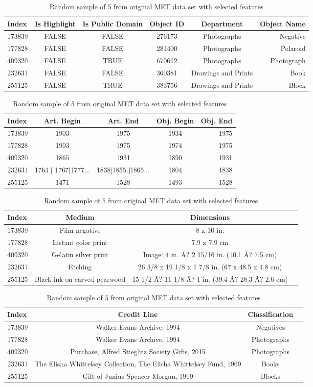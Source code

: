 \documentclass[12pt]{article}
\theoremstyle{definition}
\begin{document}
\begin{table}[htbp]
\centering 
\begin{tabular}{l*{4}{c}r}
Index              & Is Highlight & Is Public Domain & Object ID & Department & Object Name  \\
\hline
173839 & FALSE & FALSE & 276173 & Photographs & Negative   \\
177828            &  FALSE & FALSE & 281400 & Photographs &  Polaroid  \\
409320           &  FALSE & TRUE & 670612 & Photographs &  Photograph  \\
232631    &  FALSE & FALSE & 360381 & Drawings and Prints &  Book   \\
255125    &  FALSE & TRUE & 383756 & Drawings and Prints &  Block  \\
\end{tabular}
\begin{tabular}{l*{3}{c}r}
Index  & Art. Begin & Art. End  &Obj. Begin & Obj. End  \\
\hline
173839 & 1903 & 1975 & 1934  & 1975  \\
177828 & 1903 & 1975&1974  & 1975    \\
409320 &  1865 & 1931 & 1890 & 1931  \\
232631 & 1764 $|$ 1767$|$1777...&1838$|$1855  $|$1865... & 1804 & 1838  \\
255125 & 1471 & 1528 & 1493& 1528   \\
\end{tabular}
\begin{tabular}{l*{2 }{c}r}
Index  & Medium & Dimensions\\
\hline
173839 & Film negative & 8 x 10 in.\\
177828 & Instant color print & 7.9 x 7.9 cm\\
409320 & Gelatin silver print &  Image: 4 in. Ã? 2 15/16 in. (10.1 Ã? 7.5 cm)  \\ 
232631 &  Etching &  26 3/8 x 19 1/8 x 1 7/8 in. (67 x 48.5 x 4.8 cm)\\
255125 & Black ink on carved pearwood & 15 1/2 Ã? 11 1/8 Ã? 1 in. (39.4 Ã? 28.3 Ã? 2.6 cm)\\
\end{tabular}
\begin{tabular}{l*{2}{c}r}
Index           &  Credit Line & Classification\\
\hline
173839& Walker Evans Archive, 1994 & Negatives  \\
177828        &  Walker Evans Archive, 1994 & Photographs \\
409320       &  Purchase, Alfred Stieglitz Society Gifts, 2015 & Photographs \\
232631   &  The Elisha Whittelsey Collection, The Elisha Whittelsey Fund, 1969 & Books  \\
255125   & Gift of Junius Spencer Morgan, 1919 & Blocks  \\
\end{tabular}
\caption{Random sample of 5 from original MET data set with selected features}
\label{columns_tab}
\end{table}
\end{document}
